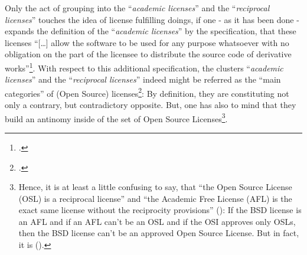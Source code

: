 Only the act of grouping into the \enquote{\emph{academic licenses}} and the
\enquote{\emph{reciprocal licenses}} touches the idea of license fulfilling
doings, if one - as it has been done - expands the definition of the
\enquote{\emph{academic licenses}} by the specification, that these licenses
\enquote{[\ldots] allow the software to be used for any purpose whatsoever with
no obligation on the part of the licensee to distribute the source code of
derivative works}\footcite[cf.][71]{Rosen2005a}. With respect to this additional
specification, the clusters \enquote{\emph{academic licenses}} and the
\enquote{\emph{reciprocal licenses}} indeed might be referred as the
\enquote{main categories} of (Open Source)
licenses\footcite[cf.][179]{Rosen2005a}: By definition, they are constituting
not only a contrary, but contradictory opposite. But, one has also to mind that
they build an antinomy inside of the set of Open Source Licenses\footnote{Hence,
it is at least a little confusing to say, that \enquote{the Open Source License
(OSL) is a reciprocal license} and \enquote{the Academic Free License (AFL) is
the exact same license without the reciprocity provisions}
(\cite[cf.][180]{Rosen2005a}): If the BSD license is an AFL and if an AFL can't
be an OSL and if the OSI approves only OSLs, then the BSD license can't be an
approved Open Source License. But in fact, it is (\cite[cf.][\nopage
wp]{OSI2012b}).}.


